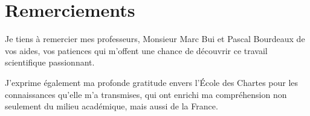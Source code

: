 \chapter*{Remerciements}
\bigskip



Je tiens à remercier mes professeurs, Monsieur Marc Bui et Pascal Bourdeaux de vos aides, vos patiences qui m'offent une chance de découvrir ce travail scientifique passionnant. 

J'exprime également ma profonde gratitude envers l'École des Chartes pour les connaissances qu'elle m'a transmises, qui ont enrichi ma compréhension non seulement du milieu académique, mais aussi de la France. 

